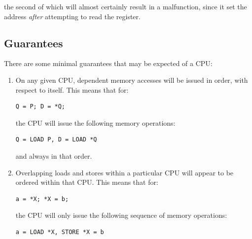 the second of which will almost certainly result in a malfunction, since it set
the address \emph{after} attempting to read the register.

\subsection{Guarantees}
\label{sec:advsync:Guarantees}

There are some minimal guarantees that may be expected of a CPU:

\begin{enumerate}
\item	On any given CPU, dependent memory accesses will be issued in order,
	with respect to itself.  This means that for:

\vspace{5pt}
\begin{minipage}[t]{\columnwidth}
\small
\begin{verbatim}
Q = P; D = *Q;
\end{verbatim}
\end{minipage}
\vspace{5pt}

	the CPU will issue the following memory operations:

\vspace{5pt}
\begin{minipage}[t]{\columnwidth}
\small
\begin{verbatim}
Q = LOAD P, D = LOAD *Q
\end{verbatim}
\end{minipage}
\vspace{5pt}

	and always in that order.

\item	Overlapping loads and stores within a particular CPU will appear to be
	ordered within that CPU.  This means that for:

\vspace{5pt}
\begin{minipage}[t]{\columnwidth}
\small
\begin{verbatim}
a = *X; *X = b;
\end{verbatim}
\end{minipage}
\vspace{5pt}

	the CPU will only issue the following sequence of memory operations:

\vspace{5pt}
\begin{minipage}[t]{\columnwidth}
\small
\begin{verbatim}
a = LOAD *X, STORE *X = b
\end{verbatim}
\end{minipage}
\vspace{5pt}


\end{enumerate}
